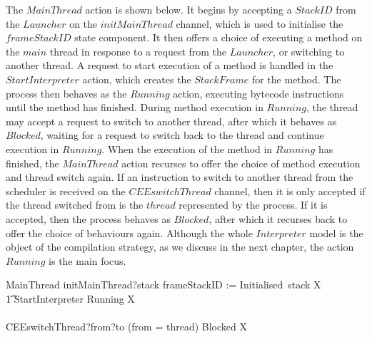 The $MainThread$ action is shown below.
It begins by accepting a $StackID$ from the $Launcher$ on the
$initMainThread$ channel, which is used to initialise the
$frameStackID$ state component.
It then offers a choice of executing a method on the $main$ thread in
response to a request from the $Launcher$, or switching to another
thread.
A request to start execution of a method is handled in the
$StartInterpreter$ action, which creates the $StackFrame$ for the
method.
The process then behaves as the $Running$ action, executing bytecode
instructions until the method has finished.
During method execution in $Running$, the thread may accept a request
to switch to another thread, after which it behaves as $Blocked$,
waiting for a request to switch back to the thread and continue
execution in $Running$.
When the execution of the method in $Running$ has finished, the
$MainThread$ action recurses to offer the choice of method execution
and thread switch again.
If an instruction to switch to another thread from the scheduler is
received on the $CEEswitchThread$ channel, then it is only accepted if
the thread switched from is the $thread$ represented by the process.
If it is accepted, then the process behaves as $Blocked$, after which
it recurses back to offer the choice of behaviours again.
Although the whole $Interpreter$ model is the object of the
compilation strategy, as we discuss in the next chapter, the action
$Running$ is the main focus.
\begin{circusaction}
  MainThread \circdef initMainThread?stack \then frameStackID := Initialised~stack \circseq \circmu X \circspot \\
  \t1 \circblockbegin
  StartInterpreter \circseq Running \circseq X \\
  {} \extchoice {} \\
  CEEswitchThread?from?to \prefixcolon (from = thread) \then Blocked \circseq X
  \circblockend
\end{circusaction}

